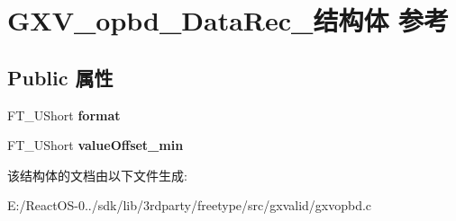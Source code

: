 \hypertarget{struct_g_x_v__opbd___data_rec__}{}\section{G\+X\+V\+\_\+opbd\+\_\+\+Data\+Rec\+\_\+结构体 参考}
\label{struct_g_x_v__opbd___data_rec__}
\subsection*{Public 属性}
\begin{DoxyCompactItemize}
\item 
\mbox{\label{struct_g_x_v__opbd___data_rec___acf247a93df6034e3ea036cc5084e1073}} 
F\+T\+\_\+\+U\+Short {\bfseries format}
\item 
\mbox{\label{struct_g_x_v__opbd___data_rec___adb7398013f9f981f94b364f1625e88ae}} 
F\+T\+\_\+\+U\+Short {\bfseries value\+Offset\+\_\+min}
\end{DoxyCompactItemize}


该结构体的文档由以下文件生成\+:\begin{DoxyCompactItemize}
\item 
E\+:/\+React\+O\+S-\/0../sdk/lib/3rdparty/freetype/src/gxvalid/gxvopbd.\+c\end{DoxyCompactItemize}

